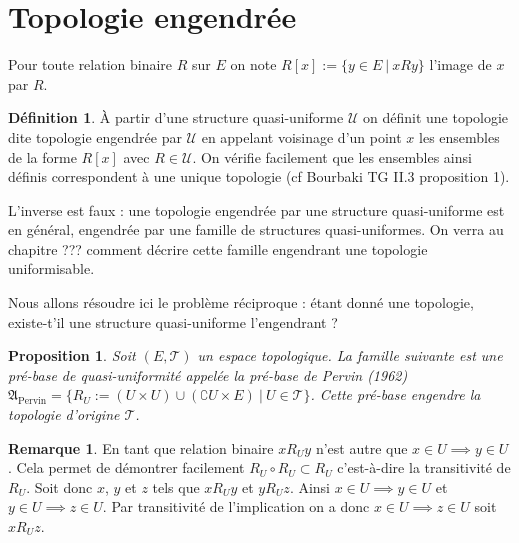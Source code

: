 \documentclass[a4paper, 11pt, french]{book}
\let\colour=\color
\theoremstyle{plain} %
\newtheorem{proposition}{Proposition}
\theoremstyle{definition} %
\newtheorem{definition}{Définition}
\newtheorem{remarque}{Remarque}
\theoremstyle{remark} %
\newcommand{\1}{\mathds{1}}
\renewcommand{\frak}[1]{\mathfrak{#1}}
\newcommand{\scr}[1]{\mathscr{#1}}
\renewcommand{\rm}[1]{\mathrm{#1}}
\newcommand\ens[2]{\{#1 \ |\ #2\}}
\begin{document}
\section{Topologie engendrée}

Pour toute relation binaire $R$ sur $E$ on note $R[x]:=\ens{y\in E}{xRy}$ l'image de $x$ par $R$.

\begin{definition}
	À partir d'une structure quasi-uniforme $\mathscr{U}$ on définit une topologie dite topologie engendrée par $\mathscr{U}$ en appelant voisinage d'un point $x$ les ensembles de la forme $R[x]$ avec $R\in\mathscr{U}$.
	On vérifie facilement que les ensembles ainsi définis correspondent à une unique topologie (cf Bourbaki TG II.3 proposition 1).
\end{definition}

L'inverse est faux : une topologie engendrée par une structure quasi-uniforme est en général, engendrée par une famille de structures quasi-uniformes.
On verra au chapitre {\colour{red} ???} comment décrire cette famille engendrant une topologie uniformisable.

Nous allons résoudre ici le problème réciproque : étant donné une topologie, existe-t'il une structure quasi-uniforme l'engendrant ?

\begin{proposition}
	Soit $(E, \scr{T})$ un espace topologique.
	La famille suivante est une pré-base de quasi-uniformité appelée la pré-base de Pervin (1962) $\frak{A}_\rm{Pervin}=\ens{R_U:=(U\times U)\cup(\complement U\times E)}{U\in\scr{T}}$.
	Cette pré-base engendre la topologie d'origine $\scr{T}$.
\end{proposition}

\begin{remarque}
	En tant que relation binaire $xR_Uy$ n'est autre que $x\in U\implies y\in U$.
	Cela permet de démontrer facilement $R_U\circ R_U\subset R_U$ c'est-à-dire la transitivité de $R_U$.
	Soit donc $x$, $y$ et $z$ tels que $xR_Uy$ et $yR_Uz$.
	Ainsi $x\in U\implies y\in U$ et $y\in U\implies z\in U$.
	Par transitivité de l'implication on a donc $x\in U\implies z\in U$ soit $xR_Uz$.
\end{remarque}
\end{document}
